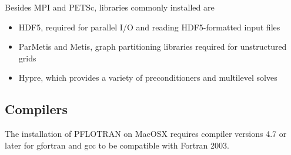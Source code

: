 \documentclass[12pt]{article}
\begin{document}
Besides MPI and PETSc, libraries commonly installed are

\begin{itemize}
\item HDF5, required for parallel I/O and reading HDF5-formatted input files
\item ParMetis and Metis, graph partitioning libraries required for 
      unstructured grids
\item Hypre, which provides a variety of preconditioners and multilevel 
      solves
\end{itemize}

\subsection{Compilers}

The installation of PFLOTRAN on MacOSX requires compiler versions 4.7 or later for gfortran and gcc to be compatible with Fortran 2003. 

\end{document}

